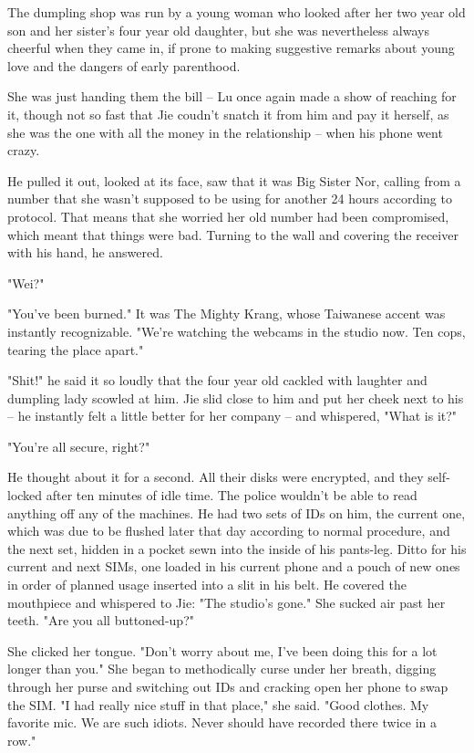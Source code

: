 The dumpling shop was run by a young woman who looked after her two
year old son and her sister's four year old daughter, but she was
nevertheless always cheerful when they came in, if prone to making
suggestive remarks about young love and the dangers of early
parenthood.

She was just handing them the bill -- Lu once again made a show of
reaching for it, though not so fast that Jie coudn't snatch it from
him and pay it herself, as she was the one with all the money in
the relationship -- when his phone went crazy.

He pulled it out, looked at its face, saw that it was Big Sister
Nor, calling from a number that she wasn't supposed to be using for
another 24 hours according to protocol. That means that she worried
her old number had been compromised, which meant that things were
bad. Turning to the wall and covering the receiver with his hand,
he answered.

"Wei?"

"You've been burned." It was The Mighty Krang, whose Taiwanese
accent was instantly recognizable. "We're watching the webcams in
the studio now. Ten cops, tearing the place apart."

"Shit!" he said it so loudly that the four year old cackled with
laughter and dumpling lady scowled at him. Jie slid close to him
and put her cheek next to his -- he instantly felt a little better
for her company -- and whispered, "What is it?"

"You're all secure, right?"

He thought about it for a second. All their disks were encrypted,
and they self-locked after ten minutes of idle time. The police
wouldn't be able to read anything off any of the machines. He had
two sets of IDs on him, the current one, which was due to be
flushed later that day according to normal procedure, and the next
set, hidden in a pocket sewn into the inside of his pants-leg.
Ditto for his current and next SIMs, one loaded in his current
phone and a pouch of new ones in order of planned usage inserted
into a slit in his belt. He covered the mouthpiece and whispered to
Jie: "The studio's gone." She sucked air past her teeth. "Are you
all buttoned-up?"

She clicked her tongue. "Don't worry about me, I've been doing this
for a lot longer than you." She began to methodically curse under
her breath, digging through her purse and switching out IDs and
cracking open her phone to swap the SIM. "I had really nice stuff
in that place," she said. "Good clothes. My favorite mic. We are
such idiots. Never should have recorded there twice in a row."

